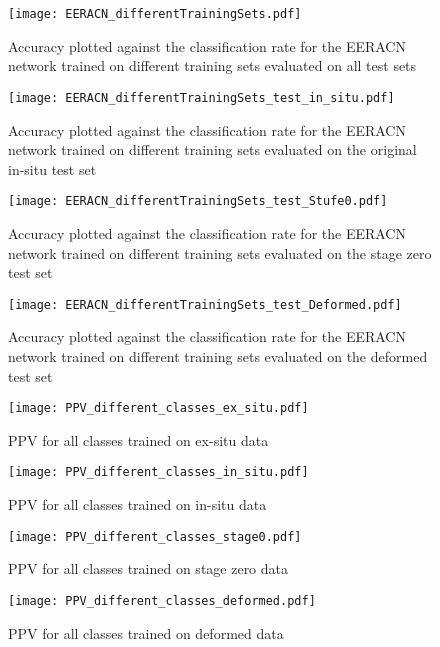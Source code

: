 \begin{figure}
  \texttt{[image: EERACN\_differentTrainingSets.pdf]}
\caption{Accuracy plotted against the classification rate for the EERACN network trained on different training sets evaluated on all test sets}
\label{fig:TPR_comparison}
\end{figure}

\begin{figure}
  \texttt{[image: EERACN\_differentTrainingSets\_test\_in\_situ.pdf]}
\caption{Accuracy plotted against the classification rate for the EERACN network trained on different training sets evaluated on the original in-situ test set}
\label{fig:TPR_comparison}
\end{figure}

\begin{figure}
  \texttt{[image: EERACN\_differentTrainingSets\_test\_Stufe0.pdf]}
\caption{Accuracy plotted against the classification rate for the EERACN network trained on different training sets evaluated on the stage zero test set}
\label{fig:TPR_comparison}
\end{figure}

\begin{figure}
  \texttt{[image: EERACN\_differentTrainingSets\_test\_Deformed.pdf]}
\caption{Accuracy plotted against the classification rate for the EERACN network trained on different training sets evaluated on the deformed test set}
\label{fig:TPR_comparison}
\end{figure}

\begin{figure}
  \texttt{[image: PPV\_different\_classes\_ex\_situ.pdf]}
\caption{PPV for all classes trained on ex-situ data}
\label{fig:TPR_comparison}
\end{figure}

\begin{figure}
  \texttt{[image: PPV\_different\_classes\_in\_situ.pdf]}
\caption{PPV for all classes trained on in-situ data}
\label{fig:TPR_comparison}
\end{figure}

\begin{figure}
  \texttt{[image: PPV\_different\_classes\_stage0.pdf]}
\caption{PPV for all classes trained on stage zero data}
\label{fig:TPR_comparison}
\end{figure}

\begin{figure}
  \texttt{[image: PPV\_different\_classes\_deformed.pdf]}
\caption{PPV for all classes trained on deformed data }
\label{fig:TPR_comparison}
\end{figure}

